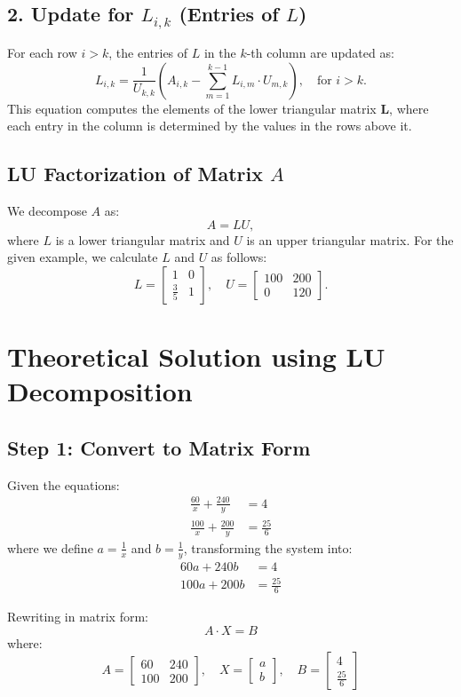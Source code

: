 \documentclass[article]{IEEEtran}
\numberwithin{figure}{enumi}
\begin{document}
\subsection*{2. Update for \( L_{i,k} \) (Entries of \( L \))}
For each row \( i > k \), the entries of \( L \) in the \( k \)-th column are updated as:  
\[
L_{i,k} = \frac{1}{U_{k,k}} \left( A_{i,k} - \sum_{m=1}^{k-1} L_{i,m} \cdot U_{m,k} \right), \quad \text{for } i > k.
\]
This equation computes the elements of the lower triangular matrix \( \mathbf{L} \), where each entry in the column is determined by the values in the rows above it.

\subsection*{LU Factorization of Matrix \( A \)}
We decompose \( A \) as:
\[
A = LU,
\]
where \( L \) is a lower triangular matrix and \( U \) is an upper triangular matrix.  
For the given example, we calculate \( L \) and \( U \) as follows:
\[
L = \begin{bmatrix} 1 & 0 \\ \frac{3}{5} & 1 \end{bmatrix}, \quad 
U = \begin{bmatrix} 100 & 200 \\ 0 & 120 \end{bmatrix}.
\]

\section*{Theoretical Solution using LU Decomposition}

\subsection*{Step 1: Convert to Matrix Form}
Given the equations:
\begin{align*}
    \frac{60}{x} + \frac{240}{y} &= 4 \\
    \frac{100}{x} + \frac{200}{y} &= \frac{25}{6}
\end{align*}
where we define \( a = \frac{1}{x} \) and \( b = \frac{1}{y} \), transforming the system into:
\begin{align*}
    60a + 240b &= 4 \\
    100a + 200b &= \frac{25}{6}
\end{align*}

Rewriting in matrix form:
\begin{equation*}
    A \cdot X = B
\end{equation*}
where:
\begin{equation*}
    A = \begin{bmatrix} 60 & 240 \\ 100 & 200 \end{bmatrix}, \quad
    X = \begin{bmatrix} a \\ b \end{bmatrix}, \quad
    B = \begin{bmatrix} 4 \\ \frac{25}{6} \end{bmatrix}
\end{equation*}
\end{document}
